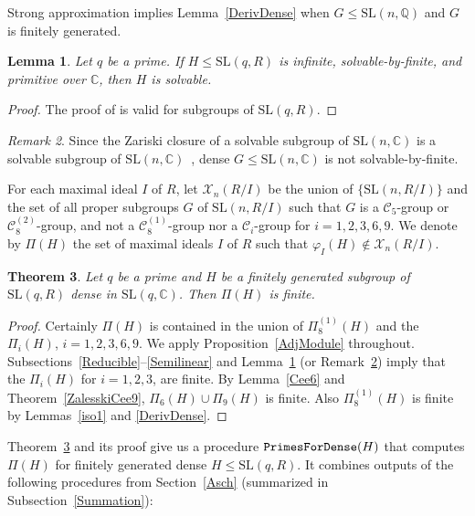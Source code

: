 \documentclass[11pt]{amsart}
\newtheorem{theorem}{Theorem}[section]
\newtheorem{lemma}[theorem]{Lemma}
\theoremstyle{definition}
\theoremstyle{remark}
\newtheorem{remark}[theorem]{Remark}
\newcommand{\Q}{\mathbb{Q}}
\newcommand{\C}{\mathbb{C}}
\newcommand{\SL}{\mathrm{SL}}
\newcommand{\calc}{\mathscr{C}}
\begin{document}
 Strong approximation implies Lemma~\ref{DerivDense}
when $G\leq \SL(n,\Q)$ and $G$ is finitely generated. 

\begin{lemma}
\label{PrimSFisSolvable}
Let $q$ be a prime. If $H\leq \SL(q,R)$  is infinite, 
solvable-by-finite, and primitive over $\C$, then $H$ is 
solvable.
\end{lemma}
\begin{proof}
The proof of \cite[Lemma~2.4]{ExpMath} is valid for subgroups 
of $\SL(q, R)$. 
\end{proof}

\begin{remark}
\label{DenseQuick}
Since the Zariski closure of a solvable subgroup of $\SL(n,\C)$ 
is a solvable subgroup of $\SL(n,\C)$~\cite[5.11]{Wehrfritz},
dense $G\leq \SL(n,\C)$ is not solvable-by-finite.
\end{remark}

For each maximal ideal $I$ of $R$, let $\mathcal{X}_n(R/I)$ be the 
union of $\{\SL(n, R/I)\}$ and the set of all proper subgroups $G$ 
of $\SL(n,R/I)$ such that $G$ is a $\calc_5$-group or 
$\calc_8^{(2)}$-group, and not a $\calc_8^{(1)}$-group nor a 
$\calc_i$-group for $i=1,2,3,6,9$. We denote by $\Pi(H)$ the set  
of maximal ideals $I$ of $R$ such that 
$\varphi_I(H)\not \in \mathcal{X}_n(R/I)$.
\begin{theorem}
\label{SATN}
Let $q$ be a prime and $H$ be a finitely generated subgroup of 
$\SL(q,R)$ dense in $\SL(q,\C)$. Then $\Pi(H)$ is finite.
\end{theorem}
\begin{proof}
Certainly $\Pi(H)$ is contained in the union of $\Pi_8^{(1)}(H)$ 
and the $\Pi_i(H)$, $i = 1,2,3,6,9$. We apply Proposition~\ref{AdjModule} 
throughout. Subsections~\ref{Reducible}--\ref{Semilinear} and 
Lemma~\ref{PrimSFisSolvable} (or Remark~\ref{DenseQuick})
imply that the $\Pi_i(H)$ for $i = 1,2,3$, are finite. 
By Lemma~\ref{Cee6} and Theorem~\ref{ZalesskiCee9}, $\Pi_6(H)\cup \Pi_9(H)$ is 
finite. Also $\Pi_8^{(1)}(H)$ is finite by Lemmas~\ref{iso1} 
and \ref{DerivDense}.
\end{proof}

Theorem~\ref{SATN} and its proof give us a procedure 
${\tt PrimesForDense}(H)$ that computes $\Pi(H)$ for finitely 
generated dense $H \leq \SL(q, R)$. It combines outputs of the 
following procedures from Section~\ref{Asch} (summarized in 
Subsection~\ref{Summation}):

\vspace{7.5pt}
\end{document}

